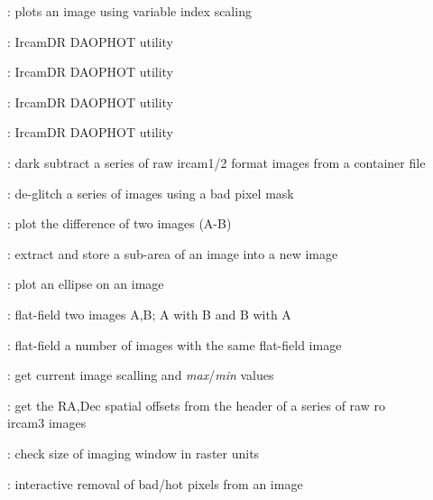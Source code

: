 \begin{description}
\begin{description}
\item []: plots an image using variable
index scaling

\item []: {\sc IrcamDR} DAOPHOT utility

\item []: {\sc IrcamDR} DAOPHOT utility

\item []: {\sc IrcamDR} DAOPHOT utility

\item []: {\sc IrcamDR} DAOPHOT utility

\item []: dark subtract a series of raw {\sc
ircam1/2} format images from a container file

\item []: de-glitch a series of images using a
bad pixel mask

\item []: plot the difference of two images (A-B)

\item []: extract and store a sub-area of an
image into a new image

\item []: plot an ellipse on an image

\item []: flat-field two images A,B;  A with B
and B with A

\item []: flat-field a number of images with
the same flat-field image

\item []: get current image scalling and {\it
max}/{\it min} values

\item []: get the RA,Dec spatial offsets from
the header of a series of raw {\sc ro} {\sc ircam3} images

\item []: check size of imaging window in
raster units

\item []: interactive removal of bad/hot pixels
from an image


\end{description}
\end{description}
